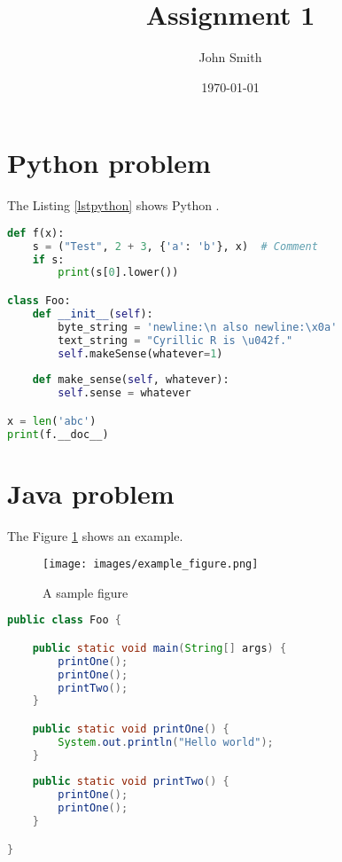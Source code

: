 \documentclass{modern}
\institute{University of Caen}
\date{\today}
\author{John Smith}
\title{Assignment 1}
\begin{document}
\thispagestyle{plain}

\makeheader

\section{Python problem}

The Listing \ref{lstpython} shows Python .

\begin{lstlisting}[language=Python, caption=Sample Python script with highlighting, label=lstpython]
def f(x):
	s = ("Test", 2 + 3, {'a': 'b'}, x)  # Comment
	if s:
		print(s[0].lower())

class Foo:
	def __init__(self):
		byte_string = 'newline:\n also newline:\x0a'
		text_string = "Cyrillic R is \u042f."
		self.makeSense(whatever=1)
	
	def make_sense(self, whatever):
		self.sense = whatever

x = len('abc')
print(f.__doc__)
\end{lstlisting}

\lipsum[1]

\section{Java problem}

\lipsum[2]

The Figure \ref{exemple} shows an example.

\begin{figure}[H]
\centering
\texttt{[image: images/example\_figure.png]}
\caption{A sample figure}
\label{exemple}
\end{figure}

\lipsum[3]

\begin{lstlisting}[language=Java, caption=Sample Java script]
public class Foo {

    public static void main(String[] args) {
        printOne();
        printOne();
        printTwo();
    }

    public static void printOne() {
        System.out.println("Hello world");
    }
    
    public static void printTwo() {
        printOne();
        printOne();
    }

}
\end{lstlisting}

\lipsum[4]
\end{document}
